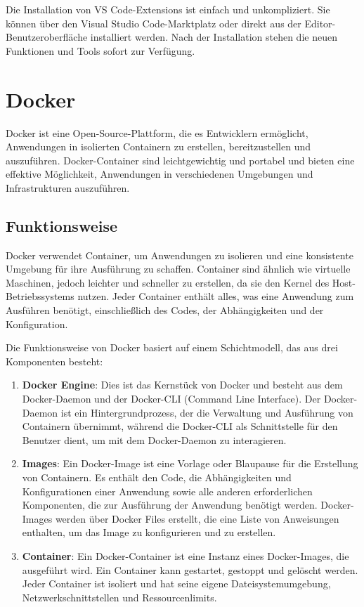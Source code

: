 Die Installation von VS Code-Extensions ist einfach und unkompliziert. Sie können über den Visual Studio Code-Marktplatz oder direkt aus der Editor-Benutzeroberfläche installiert werden.
Nach der Installation stehen die neuen Funktionen und Tools sofort zur Verfügung.
\pagebreak
\section{Docker}
Docker \cite{DockerDocs} ist eine Open-Source-Plattform, die es Entwicklern ermöglicht, Anwendungen in isolierten Containern zu erstellen, bereitzustellen und auszuführen. 
Docker-Container sind leichtgewichtig und portabel und bieten eine effektive Möglichkeit, Anwendungen in verschiedenen Umgebungen und Infrastrukturen auszuführen.

\subsection{Funktionsweise}
Docker verwendet Container, um Anwendungen zu isolieren und eine konsistente Umgebung für ihre Ausführung zu schaffen. Container sind ähnlich wie virtuelle Maschinen, 
jedoch leichter und schneller zu erstellen, da sie den Kernel des Host-Betriebssystems nutzen. Jeder Container enthält alles, was eine Anwendung zum Ausführen benötigt, 
einschließlich des Codes, der Abhängigkeiten und der Konfiguration.

Die Funktionsweise von Docker basiert auf einem Schichtmodell, das aus drei Komponenten besteht:

\begin{enumerate}
    \item \textbf{Docker Engine}: Dies ist das Kernstück von Docker und besteht aus dem Docker-Daemon und der Docker-CLI (Command Line Interface). Der Docker-Daemon ist ein Hintergrundprozess, 
    der die Verwaltung und Ausführung von Containern übernimmt, während die Docker-CLI als Schnittstelle für den Benutzer dient, um mit dem Docker-Daemon zu interagieren.
    \item \textbf{Images}: Ein Docker-Image ist eine Vorlage oder Blaupause für die Erstellung von Containern. 
    Es enthält den Code, die Abhängigkeiten und Konfigurationen einer Anwendung sowie alle anderen erforderlichen Komponenten, die zur Ausführung der Anwendung benötigt werden. 
    Docker-Images werden über Docker Files erstellt, die eine Liste von Anweisungen enthalten, um das Image zu konfigurieren und zu erstellen.
    \item \textbf{Container}: Ein Docker-Container ist eine Instanz eines Docker-Images, die ausgeführt wird. Ein Container kann gestartet, gestoppt und gelöscht werden. 
    Jeder Container ist isoliert und hat seine eigene Dateisystemumgebung, Netzwerkschnittstellen und Ressourcenlimits.
    \end{enumerate}

